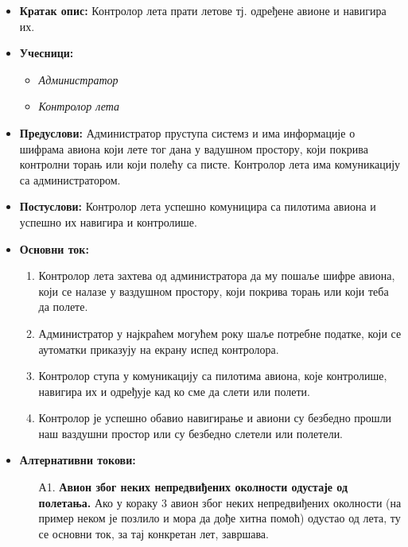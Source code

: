 \documentclass{article}
\begin{document}
\begin{itemize}
    \item \textbf{Кратак опис:} Контролор лета прати летове тј. одређене авионе и навигира их.
    \item \textbf{Учесници:}
        \begin{itemize}
            \item \textit{Администратор}
            \item \textit{Контролор лета}
        \end{itemize}
    \item \textbf{Предуслови:} Администратор пруступа системз и има информације о шифрама авиона који лете тог дана у вадушном простору, који покрива контролни торањ или који полећу са писте. Контролор лета има комуникацију са администратором. 
    \item \textbf{Постуслови:} Контролор лета успешно комуницира са пилотима авиона и успешно их навигира и контролише.
    \item \textbf{Основни ток:}
        \begin{enumerate}
            \item Контролор лета захтева од администратора да му пошаље шифре авиона, који се налазе у ваздушном простору, који покрива торањ или који теба да полете.
            \item Администратор у најкраћем могућем року шаље потребне податке, који се аутоматки приказују на екрану испед контролора.
            \item Контролор ступа у комуникацију са пилотима авиона, које контролише, навигира их и одређује кад ко сме да слети или полети.
            \item Контролор је успешно обавио навигирање и авиони су безбедно прошли наш ваздушни простор или су безбедно слетели или полетели.
        \end{enumerate}
    
    \item \textbf{Алтернативни токови:}
        \begin{itemize}
            \item[А1.] \textbf{Авион због неких непредвиђених околности одустаје од полетања.} Ако у кораку 3 авион због неких непредвиђених околности (на пример неком је позлило и мора да дође хитна помоћ) одустао од лета, ту се основни ток, за тај конкретан лет, завршава. 
        \end{itemize}
\end{itemize}
\end{document}
